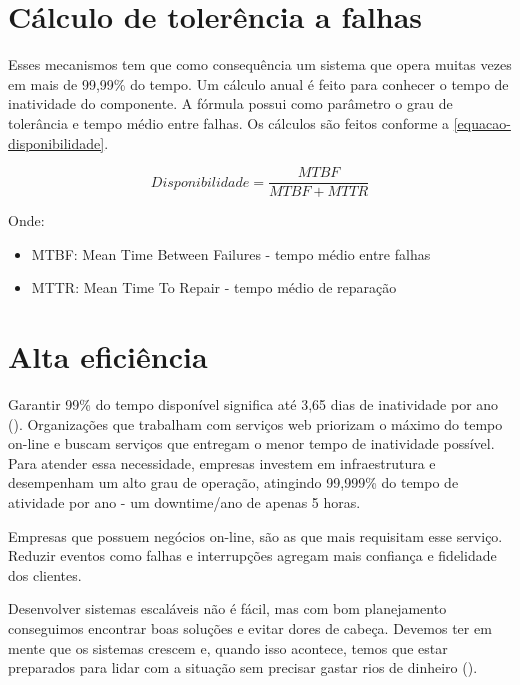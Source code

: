 \section{Cálculo de tolerência a falhas}

Esses mecanismos tem que como consequência um sistema que opera
muitas vezes em mais de 99,99\% do tempo.
Um cálculo anual é feito para conhecer o tempo de inatividade do componente.
A fórmula possui como parâmetro o grau de tolerância e tempo médio entre falhas.
Os cálculos são feitos conforme a \autoref{equacao-disponibilidade}.

\begin{equation}\label{equacao-disponibilidade}
Disponibilidade = \frac{MTBF}{MTBF + MTTR}
\end{equation}

Onde:

\begin{itemize}

	\item MTBF: Mean Time Between Failures - tempo médio entre falhas

	\item MTTR: Mean Time To Repair - tempo médio de reparação

\end{itemize}

\section{Alta eficiência}

Garantir 99\% do tempo disponível significa até 3,65 dias de inatividade por ano (\cite{alta-eficiencia}).
Organizações que trabalham com serviços web priorizam o máximo do tempo on-line e buscam
serviços que entregam o menor tempo de inatividade possível.
Para atender essa necessidade, empresas investem em infraestrutura e desempenham um alto
grau de operação, atingindo 99,999\% do tempo de atividade por ano - um downtime/ano de
apenas 5 horas.

Empresas que possuem negócios on-line, são as que mais requisitam esse serviço.
Reduzir eventos como falhas e interrupções agregam mais confiança e fidelidade dos clientes.

Desenvolver sistemas escaláveis não é fácil, mas com bom planejamento conseguimos encontrar boas 
soluções e evitar dores de cabeça. Devemos ter em mente que os sistemas crescem e, quando isso 
acontece, temos que estar preparados para lidar com a situação sem precisar gastar rios de dinheiro
(\cite{escalabilidade-de-aplicacoes-web}).

